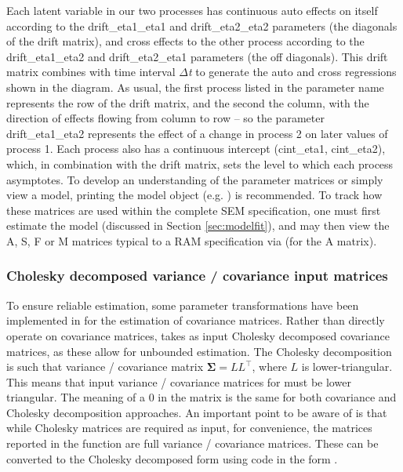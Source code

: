 \documentclass[nojss]{jss}\usepackage[]{graphicx}\usepackage[]{color}
\begin{document}
Each latent variable in our two processes has continuous auto effects on itself according to the drift\_eta1\_eta1 and drift\_eta2\_eta2 parameters (the diagonals of the drift matrix), and cross effects to the other process according to the drift\_eta1\_eta2 and drift\_eta2\_eta1 parameters (the off diagonals). This drift matrix combines with time interval $\Delta$\textit{t} to generate the auto and cross regressions shown in the diagram.  As usual, the first process listed in the parameter name represents the row of the drift matrix, and the second the column, with the direction of effects flowing from column to row -- so the parameter drift\_eta1\_eta2 represents the effect of a change in process 2 on later values of process 1. 
Each process also has a continuous intercept (cint{\_}eta1, cint{\_}eta2), which, in combination with the drift matrix, sets the level to which each process asymptotes.
To develop an understanding of the parameter matrices or simply view a model, printing the model object (e.g. ) is recommended. To track how these matrices are used within the complete SEM specification, one must first estimate the model (discussed in Section \ref{sec:modelfit}), and may then view the A, S, F or M matrices typical to a RAM specification \citet{mcardle1984algebraic} via  (for the A matrix).

\subsubsection{Cholesky decomposed variance / covariance input matrices}\label{sec:transforms}\nopagebreak
To ensure reliable estimation, some parameter transformations have been implemented in  for the estimation of covariance matrices. Rather than directly operate on covariance matrices,  takes as input Cholesky decomposed covariance matrices, as these allow for unbounded estimation. The Cholesky decomposition is such that variance / covariance matrix $\boldsymbol{\Sigma} = LL^\top$, where $L$ is lower-triangular. This means that input variance / covariance matrices for  must be lower triangular. The meaning of a 0 in the matrix is the same for both covariance and Cholesky decomposition approaches. An important point to be aware of is that while Cholesky matrices are required as input, for convenience, the matrices reported in the  function are full variance / covariance matrices. These can be converted to the Cholesky decomposed form using code in the form .
\end{document}
